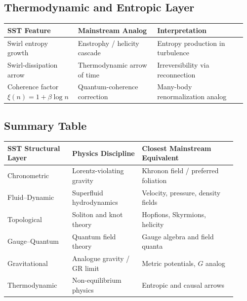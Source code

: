 \documentclass[11pt]{article}
\begin{document}
        \subsection*{Thermodynamic and Entropic Layer}

            \begin{tabular}{p{0.28\linewidth} p{0.32\linewidth} p{0.36\linewidth}}
                \textbf{SST Feature} & \textbf{Mainstream Analog} & \textbf{Interpretation}\\
                \hline
                Swirl entropy growth & Enstrophy / helicity cascade & Entropy production in turbulence\\
                Swirl-dissipation arrow & Thermodynamic arrow of time & Irreversibility via reconnection\\
                Coherence factor \(\xi(n)=1+\beta\log n\) & Quantum-coherence correction & Many-body renormalization analog\\
            \end{tabular}

        \subsection*{Summary Table}

            \begin{center}
                \begin{tabular}{p{0.26\linewidth} p{0.28\linewidth} p{0.38\linewidth}}
                    \textbf{SST Structural Layer} & \textbf{Physics Discipline} & \textbf{Closest Mainstream Equivalent}\\
                    \hline
                    Chronometric & Lorentz-violating gravity & Khronon field / preferred foliation\\
                    Fluid–Dynamic & Superfluid hydrodynamics & Velocity, pressure, density fields\\
                    Topological & Soliton and knot theory & Hopfions, Skyrmions, helicity\\
                    Gauge–Quantum & Quantum field theory & Gauge algebra and field quanta\\
                    Gravitational & Analogue gravity / GR limit & Metric potentials, \(G\) analog\\
                    Thermodynamic & Non-equilibrium physics & Entropic and causal arrows\\
                \end{tabular}
            \end{center}
\normalsize
\end{document}
